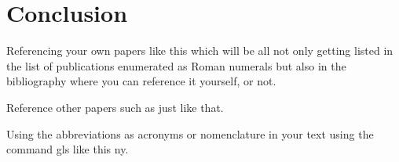 \chapter{Conclusion}

Referencing your own papers like this which will be all not only getting listed in the list of publications enumerated as Roman numerals but also in the bibliography where you can reference it yourself, or not. \cite{paper1,paper2,paper3,paper4,paper5, paper6, paper7, paper8}

Reference other papers such as \cite{einstein, knuthwebsite, latexcompanion} just like that.

Using the abbreviations as acronyms or nomenclature in your text using the command gls like this \gls{ny}.